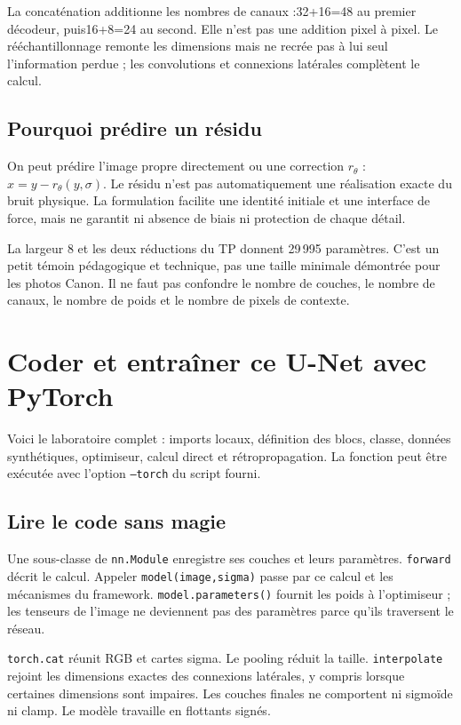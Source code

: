 \documentclass[12pt,a4paper,oneside]{report}
\begin{document}
La concaténation additionne les nombres de canaux :32+16=48 au premier
décodeur, puis16+8=24 au second. Elle n'est pas une addition pixel à pixel.
Le rééchantillonnage remonte les dimensions mais ne recrée pas à lui seul
l'information perdue ; les convolutions et connexions latérales complètent
le calcul.

\section{Pourquoi prédire un résidu}

On peut prédire l'image propre directement ou une correction $r_\theta$ :
$\hat x=y-r_\theta(y,\sigma)$. Le résidu n'est pas automatiquement une
réalisation exacte du bruit physique. La formulation facilite une identité
initiale et une interface de force, mais ne garantit ni absence de biais ni
protection de chaque détail.

La largeur 8 et les deux réductions du TP donnent 29\,995 paramètres.
C'est un petit témoin pédagogique et technique, pas une taille minimale
démontrée pour les photos Canon. Il ne faut pas confondre le nombre de couches,
le nombre de canaux, le nombre de poids et le nombre de pixels de contexte.

\chapter{Coder et entraîner ce U-Net avec PyTorch}

Voici le laboratoire complet : imports locaux, définition des blocs, classe,
données synthétiques, optimiseur, calcul direct et rétropropagation. La fonction
peut être exécutée avec l'option \texttt{--torch} du script fourni.



\section{Lire le code sans magie}

Une sous-classe de \texttt{nn.Module} enregistre ses couches et leurs paramètres.
\texttt{forward} décrit le calcul. Appeler \texttt{model(image,sigma)} passe
par ce calcul et les mécanismes du framework. \texttt{model.parameters()}
fournit les poids à l'optimiseur ; les tenseurs de l'image ne deviennent pas
des paramètres parce qu'ils traversent le réseau.

\texttt{torch.cat} réunit RGB et cartes sigma. Le pooling réduit la taille.
\texttt{interpolate} rejoint les dimensions exactes des connexions latérales,
y compris lorsque certaines dimensions sont impaires. Les couches finales
ne comportent ni sigmoïde ni clamp. Le modèle travaille en flottants signés.
\end{document}
